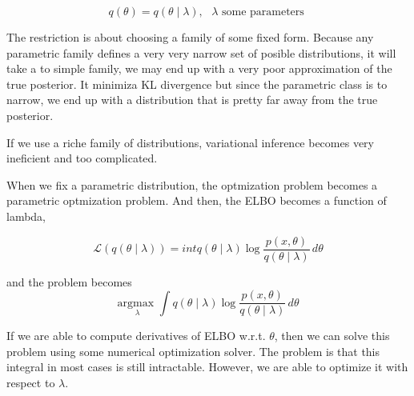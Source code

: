 
\begin{equation}
 q(\theta) = q(\theta \mid \lambda), \ \ \ \lambda \text{ some parameters }
\end{equation}

The restriction is about choosing a family of some fixed form.
Because any parametric family defines a very very narrow set of posible distributions, it will take a to simple family, we may end up with a very poor approximation of the true posterior. It minimiza KL divergence but since the parametric class is to narrow, we end up with a distribution that is pretty far away from the true posterior.

If we use a riche family of distributions, variational inference becomes very ineficient and too complicated.  

\vspace{0.3cm}

When we fix a parametric distribution, the optmization problem becomes a parametric optmization problem.
And then, the ELBO becomes a function of lambda,

\begin{equation}
 \mathcal{L}(q(\theta \mid \lambda )) = int q(\theta\mid \lambda ) \log \frac{p(x,\theta)}{q(\theta\mid \lambda )} \, d\theta
\end{equation}

and the problem becomes
\begin{equation}
  \underset{\lambda}{\text{argmax }} \int q(\theta\mid \lambda ) \log \frac{p(x,\theta)}{q(\theta\mid \lambda )} \, d\theta
\end{equation}


If we are able to compute derivatives of ELBO w.r.t. $\theta$, then we can solve this problem using some numerical optimization solver. 
The problem is that this integral in most cases is still intractable.
However, we are able to optimize it with respect to $\lambda$. 




